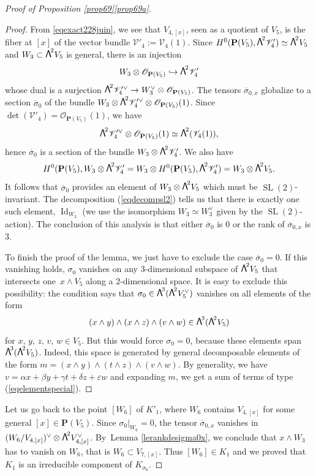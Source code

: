 \documentclass[JEP,XML,SOM,Unicode, NoEqCountersInSection,NoFloatCountersInSection]{cedram}
\let\mathcal\mathscr
\newcommand\hto{\mathrel{\lhook\joinrel\to}}
\theoremstyle{definition}
\renewcommand\P{{\mathbf P}}\let\PP\P
\newcommand\cO{\mathcal{O}}\let\OO\cO
\newcommand\cV{\mathcal{V}}
\let\isom\simeq
\let\eps\varepsilon
\let\cong\simeq
\let\dual\vee
\DeclareMathOperator{\Id}{Id}
\DeclareMathOperator{\SL}{SL}
\newcommand\bw[1]{{\hbox{\large$\mathsf{\Lambda}$}^{\!#1}}}
\begin{document}
\begin{proof}[Proof of Proposition \ref{prop69}\eqref{prop69a}]
\begin{proof}
From \eqref{eqexact228juin}, we see that $V_{4,[x]}$, seen as a quotient of $V_5$, is the fiber at $[x]$ of the vector bundle $\cV'_4:=\cV_4(1)$. Since $H^0(\P(V_5),\bw2\cV'_4)\isom \bw2V_5$ and $W_3\subset \bw2V_5$ is general, there is an injection
\[
 W_3\otimes \cO_{\P(V_5)}\hto \bw2\cV'_4
\]
whose dual is a
surjection $\bw2\cV_4^{\prime\dual}\to W_3^\dual\otimes \cO_{\P(V_5)}$. The tensors $\overline{\sigma}_{0,x} $
globalize to a section $\overline{\sigma}_0$ of the bundle $W_3\otimes \bw2\cV_4^{\prime\dual}\otimes \cO_{\P(V_5)}(1)$.
Since $\det(\cV'_4)=\cO_{\P(V_5)}(1)$, we have
\[
\bw2\cV_4^{\prime\dual}\otimes \cO_{\P(V_5)}(1)\cong \bw2(\cV_4(1)),
\]
hence $\overline{\sigma}_0$ is a section of the bundle $W_3\otimes \bw2\cV_4'$.
We also have
\[
H^0(\P(V_5),W_3\otimes \bw2\cV_4'=W_3\otimes H^0(\P(V_5),\bw2\cV_4')=W_3\otimes \bw2V_5.
\]
It follows that $\overline{\sigma}_0$ provides an element of $W_3\otimes \bw2V_5$ which must
be $\SL(2)$-invariant. The decomposition (\ref{eqdecompsl2}) tells us that there is exactly
one such element, $\Id_{W_3}$ (we use the isomorphism $W_3\cong W_3^\dual$ given by the $\SL(2)$-action).
The conclusion of this analysis is that either $\overline{\sigma}_0$ is $0$ or the rank of $\overline{\sigma}_{0,x}$ is $3$.

To finish the proof of the lemma, we just have to exclude the case
$\overline{\sigma}_0=0$. If this vanishing holds, $\sigma_0$ vanishes on any $3$-dimensional subspace of $\bw2 V_5$ that intersects
one~$x\wedge V_5$ along a $2$-dimensional space. It is easy to exclude this possibility: the condition says that $\sigma_0\in\bw3(\bw2V_5^\dual)$ vanishes on all elements of the form
\begin{equation}
\label{eqelementspecial}
(x\wedge y)\wedge (x\wedge z)\wedge( v\wedge w)\in \bw3(\bw2V_5)
\end{equation}
for $x,\,y,\,z,\,v,\,w\in V_5$. But this would force $\sigma_0=0$, because these elements span $\bw3(\bw2V_5)$. Indeed,
this space is generated by general
decomposable elements of the form $m=(x\wedge y)\wedge (t\wedge z)\wedge( v\wedge w)$. By generality, we have
$v=\alpha x+\beta y+\gamma t+\delta z+\eps w$ and expanding $m$, we get a sum of terms of
type (\ref{eqelementspecial}).
\end{proof}

Let us go back to the point $[W_6]$ of $K'_1$, where $W_6$ contains $ V_{4,[x]}$ for some general $[x]\in\P(V_5)$. Since $\sigma_{0}\vert_{ W_6}=0$, the
tensor $\overline{\sigma}_{0,x}$ vanishes in $(W_6/V_{4,[x]})^\dual\otimes \bw2V_{4,[x]}^\dual$.
By~Lemma \ref{lerankdesigma0x}, we conclude that $x\wedge W_3$ has to vanish on $W_6$, that is
$W_6\subset V_{7,[x]}$. Thus $[W_6]\in K_1$ and we proved that $K_1$ is an irreducible component
of $K_{\sigma_0}$.


\end{proof}
\end{document}
